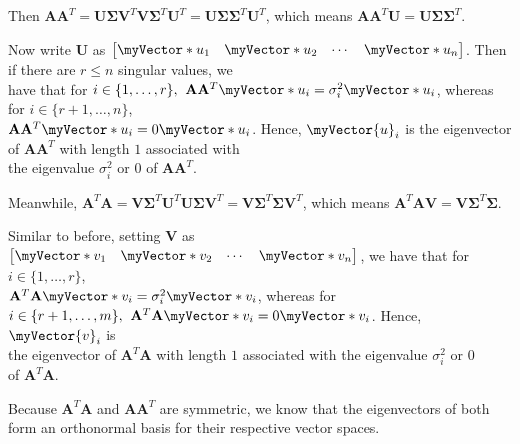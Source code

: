 \documentclass{book}
\newcommand{\hTwo}{%
   \color{MidnightBlue}%
   \fontsize{13}{15}\selectfont%
}
\newcommand{\hFour}{%
   \color{Cerulean}
   \fontsize{12}{14}\selectfont%
}
\newenvironment{myIndent}{%
   \begin{adjustwidth}{2.5em}{0em}%
}{%
   \end{adjustwidth}%
}
\newenvironment{myTindent}{%
   \begin{adjustwidth}{7.5em}{0em}%
}{%
   \end{adjustwidth}%
}
\newcommand{\retTwo}{\hfill\bigbreak}
\newcommand{\mVec}[1]{\myVector{#1}}
\newcommand{\mVecAst}[1]{\myVector*{#1}}
\newcommand{\mMat}[1]{\mathbf{#1}}
\begin{document}
   {\begin{myIndent} \hTwo
      Then $\mMat{A}\mMat{A}^T = \mMat{U}\bm{\Sigma}\mMat{V}^T\mMat{V}\bm{\Sigma}^T\mMat{U}^T = \mMat{U}\bm{\Sigma}\bm{\Sigma}^T\mMat{U}^T$, which means $\mMat{A}\mMat{A}^T\mMat{U} = \mMat{U}\bm{\Sigma}\bm{\Sigma}^T$.\retTwo

      Now write $\mMat{U}$ as $
      \begin{bmatrix}
         \mVecAst{u}_1 & \mVecAst{u}_2 & \cdots & \mVecAst{u}_n
      \end{bmatrix}$. Then if there are $r \leq n$ singular values, we\\ [2pt] have that for $i \in \{1, \ldots, r\}, \hspace{0.4em} \mMat{A}\mMat{A}^T\mVecAst{u}_i = \sigma_i^2\mVecAst{u}_i$, whereas for $i \in \{r+1, \ldots, n\}$,\\ [2pt] $\mMat{A}\mMat{A}^T\mVecAst{u}_i = 0\mVecAst{u}_i$. Hence, $\mVec{u}_i$ is the eigenvector of $\mMat{A}\mMat{A}^T$ with length $1$ associated with\\[2pt] the eigenvalue $\sigma_i^2$ or $0$ of $\mMat{A}\mMat{A}^T$. \retTwo \retTwo
      

      Meanwhile, $\mMat{A}^T\mMat{A} = \mMat{V}\bm{\Sigma}^T\mMat{U}^T\mMat{U}\bm{\Sigma}\mMat{V}^T = \mMat{V}\bm{\Sigma}^T\bm{\Sigma}\mMat{V}^T$, which means $\mMat{A}^T\mMat{A}\mMat{V} = \mMat{V}\bm{\Sigma}^T\bm{\Sigma}$.\retTwo

      Similar to before, setting $\mMat{V}$ as $
      \begin{bmatrix}
         \mVecAst{v}_1 & \mVecAst{v}_2 & \cdots & \mVecAst{v}_n
      \end{bmatrix}$, we have that for $i \in \{1, \ldots, r\}$,\\ [2pt] $\mMat{A}^T\mMat{A}\mVecAst{v}_i = \sigma_i^2\mVecAst{v}_i$, whereas for $i \in \{r+1, \ldots, m\}, \hspace{0.4em} \mMat{A}^T\mMat{A}\mVecAst{v}_i = 0\mVecAst{v}_i$. Hence, $\mVec{v}_i$ is\\ [2pt] the eigenvector of $\mMat{A}^T\mMat{A}$ with length $1$ associated with the eigenvalue $\sigma_i^2$ or $0$\\ [2pt] of $\mMat{A}^T\mMat{A}$. \retTwo
      
      {\begin{myTindent} \hFour
         Because $\mMat{A}^T\mMat{A}$ and $\mMat{A}\mMat{A}^T$ are symmetric, we know that the eigenvectors of both form an orthonormal basis for their respective vector spaces. \retTwo
      \end{myTindent}}
   \end{myIndent}}
\end{document}
